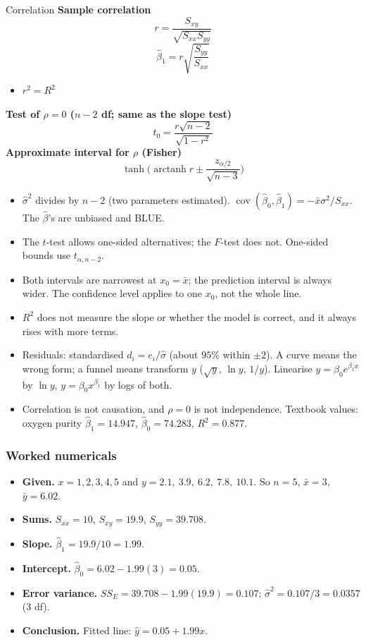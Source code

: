 \begin{formulabox}{Correlation}
\textbf{Sample correlation}
\[ r=\frac{S_{xy}}{\sqrt{S_{xx}S_{yy}}} \]
\[ \hat\beta_1=r\sqrt{\frac{S_{yy}}{S_{xx}}} \]
\begin{itemize}
  \item $r^2=R^2$
\end{itemize}
\textbf{Test of $\rho=0$ ($n-2$ df; same as the slope test)}
\[ t_0=\frac{r\sqrt{n-2}}{\sqrt{1-r^2}} \]
\textbf{Approximate interval for $\rho$ (Fisher)}
\[ \tanh\!\Big(\operatorname{arctanh}r\pm\frac{z_{\alpha/2}}{\sqrt{n-3}}\Big) \]
\end{formulabox}

\begin{notebox}
\begin{itemize}
  \item $\hat\sigma^2$ divides by $n-2$ (two parameters estimated). $\operatorname{cov}(\hat\beta_0,\hat\beta_1)=-\bar{x}\sigma^2/S_{xx}$. The $\hat\beta$'s are unbiased and BLUE.
  \item The $t$-test allows one-sided alternatives; the $F$-test does not. One-sided bounds use $t_{\alpha,n-2}$.
  \item Both intervals are narrowest at $x_0=\bar{x}$; the prediction interval is always wider. The confidence level applies to one $x_0$, not the whole line.
  \item $R^2$ does not measure the slope or whether the model is correct, and it always rises with more terms.
  \item Residuals: standardised $d_i=e_i/\hat\sigma$ (about $95\%$ within $\pm2$). A curve means the wrong form; a funnel means transform $y$ ($\sqrt{y}$, $\ln y$, $1/y$). Linearise $y=\beta_0e^{\beta_1x}$ by $\ln y$, $y=\beta_0x^{\beta_1}$ by logs of both.
  \item Correlation is not causation, and $\rho=0$ is not independence. Textbook values: oxygen purity $\hat\beta_1=14.947$, $\hat\beta_0=74.283$, $R^2=0.877$.
\end{itemize}
\end{notebox}

\subsubsection*{Worked numericals}

\begin{example}
\begin{itemize}
  \item \textbf{Given.} $x=1,2,3,4,5$ and $y=2.1,\ 3.9,\ 6.2,\ 7.8,\ 10.1$. So $n=5$, $\bar{x}=3$, $\bar{y}=6.02$.
  \item \textbf{Sums.} $S_{xx}=10$, $S_{xy}=19.9$, $S_{yy}=39.708$.
  \item \textbf{Slope.} $\hat\beta_1=19.9/10=1.99$.
  \item \textbf{Intercept.} $\hat\beta_0=6.02-1.99(3)=0.05$.
  \item \textbf{Error variance.} $SS_E=39.708-1.99(19.9)=0.107$; $\hat\sigma^2=0.107/3=0.0357$ ($3$ df).
  \item \textbf{Conclusion.} Fitted line: $\hat{y}=0.05+1.99x$.
\end{itemize}
\end{example}

